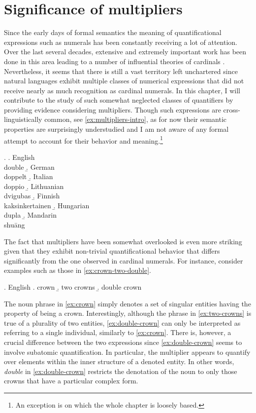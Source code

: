 \section{Significance of multipliers}\label{sec:significance-of-multipliers}\largerpage[2]

Since the early days of formal semantics \citep[starting with][]{montague1973proper} the meaning of quantificational expressions such as numerals has been constantly receiving a lot of attention. Over the last several decades, extensive and extremely important work has been done in this area leading to a number of influential theories of cardinals \citep[e.g.,][]{barwise_cooper1981generalized,scha1981distributive,landman2004indefinites,ionin_matushansky2006composition}. Nevertheless, it seems that there is still a vast territory left unchartered since natural languages exhibit multiple classes of numerical expressions that did not receive nearly as much recognition as cardinal numerals. In this chapter, I will contribute to the study of such somewhat neglected classes of quantifiers by providing evidence considering multipliers. Though such expressions are cross-linguistically common, see \ref{ex:multipliers-intro}, as for now their semantic properties are surprisingly understudied and I am not aware of any formal attempt to account for their behavior and meaning.\footnote{An exception is \citet{wagiel2020entities} on which the whole chapter is loosely based.}

\ex.\label{ex:multipliers-intro} \a. English\\
double
\b. German\\
doppelt
\b. Italian\\
doppio
\b. Lithuanian\\
dvigubas
\b. Finnish\\
kaksinkertainen
\b. Hungarian\\
dupla
\b. Mandarin\\
shu{\=a}ng

The fact that multipliers have been somewhat overlooked is even more striking given that they exhibit non-trivial quantificational behavior that differs significantly from the one observed in cardinal numerals. For instance, consider examples such as those in \ref{ex:crown-two-double}. 

\ex. English\label{ex:crown-two-double}
\a. crown\label{ex:crown}
\b. two crowns\label{ex:two-crowns}
\b. double crown\label{ex:double-crown}

The noun phrase in \ref{ex:crown} simply denotes a set of singular entities having the property of being a crown. Interestingly, although the phrase in \ref{ex:two-crowns} is true of a plurality of two entities, \ref{ex:double-crown} can only be interpreted as referring to a single individual, similarly to \ref{ex:crown}. There is, however, a crucial difference between the two expressions since \ref{ex:double-crown} seems to involve subatomic quantification. In particular, the multiplier appears to quantify over elements within the inner structure of a denoted entity. In other words, \textit{double} in \ref{ex:double-crown} restricts the denotation of the noun to only those crowns that have a particular complex form.

